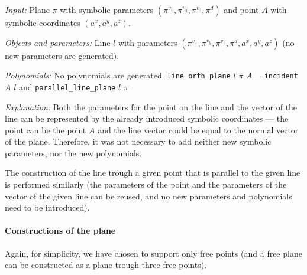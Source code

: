 \documentclass[final,1p,times,authoryear]{elsarticle}
\begin{document}
\begin{description}
{\em Input:} Plane $\pi$ with symbolic parameters $(\pi^{v_x},
\pi^{v_y}, \pi^{v_z}, \pi^{d})$ and point $A$ with symbolic
coordinates $(a^x, a^y, a^z)$.

{\em Objects and parameters:} Line $l$ with parameters $(\pi^{v_x},
\pi^{v_y}, \pi^{v_z}, \pi^{d}, a^x, a^y, a^z)$ (no new parameters are
generated).

{\em Polynomials:} No polynomials are generated.
                   {\tt line\_orth\_plane} $l$ $\pi$ $A$ = {\tt incident} $A$ $l$ and {\tt parallel\_line\_plane} $l$ $\pi$

{\em Explanation:} Both the parameters for the point on the line and
the vector of the line can be represented by the already introduced
symbolic coordinates --- the point can be the point $A$ and the line
vector could be equal to the normal vector of the plane. Therefore, it
was not necessary to add neither new symbolic parameters, nor the new
polynomials.
\end{description}

The construction of the line trough a given point that is parallel to
the given line is performed similarly (the parameters of the point and
the parameters of the vector of the given line can be reused, and no
new parameters and polynomials need to be introduced).


\paragraph{Constructions of the plane}
Again, for simplicity, we have chosen to support only free points (and
a free plane can be constructed as a plane trough three free points).
\end{document}
